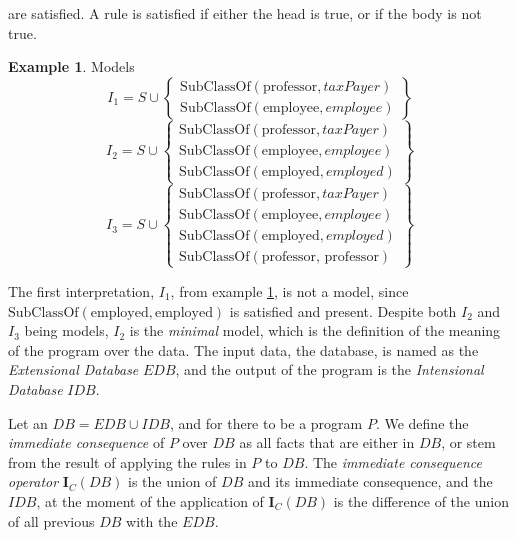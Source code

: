 \documentclass[manuscript,screen,review]{acmart}
\theoremstyle{definition}
\newtheorem{exmp}{Example}[section]
\begin{document}
are satisfied. A rule is satisfied if either the head is true, or if the body is not true.
\begin{exmp}{Models}\label{ex4}
	\[
		I_1 = S \cup \left\{  \begin{array}{l}
			\text{SubClassOf}(\text{professor}, {taxPayer}) \\
			\text{SubClassOf}(\text{employee}, {employee})
		\end{array}\right\}
	\]
	\[
		I_2 = S \cup \left\{  \begin{array}{l}
			\text{SubClassOf}(\text{professor}, {taxPayer}) \\
			\text{SubClassOf}(\text{employee}, {employee})  \\
			\text{SubClassOf}(\text{employed}, {employed})
		\end{array}\right\}
	\]
	\[
		I_3 = S \cup \left\{  \begin{array}{l}
			\text{SubClassOf}(\text{professor}, {taxPayer}) \\
			\text{SubClassOf}(\text{employee}, {employee} ) \\
			\text{SubClassOf}(\text{employed}, {employed})  \\
			\text{SubClassOf}(\text{professor, professor})
		\end{array}\right\}
	\]
\end{exmp}
The first interpretation, $I_1$, from example \ref{ex4}, is not a model, since $\text{SubClassOf}(\text{employed}, \text{employed})$ is satisfied
and present. Despite both $I_2$ and $I_3$ being models, $I_2$ is the \textit{minimal} model, which is the definition of the meaning of the program
over the data. The input data, the database, is named as the \textit{Extensional Database} $EDB$, and the output of the program is the \textit{Intensional Database}
$IDB$.

Let an $DB = EDB \cup IDB$, and for there to be a program $P$. We define the \textit{immediate consequence} of $P$ over $DB$ as all facts
that are either in $DB$, or stem from the result of applying the rules in $P$ to $DB$. The \textit{immediate consequence operator}
$\textbf{I}_C(DB)$ is the union of $DB$ and its immediate consequence, and the $IDB$, at the moment of the application of $\textbf{I}_C(DB)$
is the difference of the union of all previous $DB$ with the $EDB$.
\end{document}
